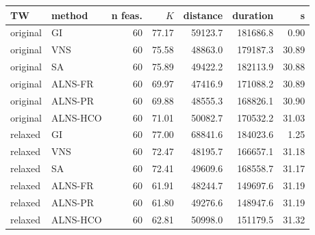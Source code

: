 \begin{tabular}{llrrrrr}
\toprule
TW & method & n feas. & $K$ & distance & duration & s \\
\midrule
original & GI & 60 & 77.17 & 59123.7 & 181686.8 & 0.90 \\
original & VNS & 60 & 75.58 & 48863.0 & 179187.3 & 30.89 \\
original & SA & 60 & 75.89 & 49422.2 & 182113.9 & 30.88 \\
original & ALNS-FR & 60 & 69.97 & 47416.9 & 171088.2 & 30.89 \\
original & ALNS-PR & 60 & 69.88 & 48555.3 & 168826.1 & 30.90 \\
original & ALNS-HCO & 60 & 71.01 & 50082.7 & 170532.2 & 31.03 \\
relaxed & GI & 60 & 77.00 & 68841.6 & 184023.6 & 1.25 \\
relaxed & VNS & 60 & 72.47 & 48195.7 & 166657.1 & 31.18 \\
relaxed & SA & 60 & 72.41 & 49609.6 & 168558.7 & 31.17 \\
relaxed & ALNS-FR & 60 & 61.91 & 48244.7 & 149697.6 & 31.19 \\
relaxed & ALNS-PR & 60 & 61.80 & 49276.6 & 148947.6 & 31.19 \\
relaxed & ALNS-HCO & 60 & 62.81 & 50998.0 & 151179.5 & 31.32 \\
\bottomrule
\end{tabular}
